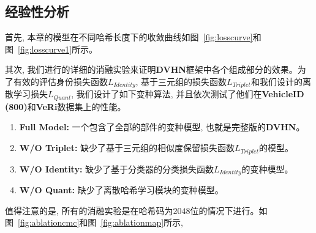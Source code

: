 \subsection{经验性分析}
首先, 本章的模型在不同哈希长度下的收敛曲线如图~\ref{fig:losscurve}和图~\ref{fig:losscurve1}所示。\par
其次, 我们进行的详细的消融实验来证明\textbf{DVHN}框架中各个组成部分的效果。为了有效的评估身份损失函数$L_{Identity}$, 基于三元组的损失函数$L_{Triplet}$和我们设计的离散学习损失$L_{Quant}$, 我们设计了如下变种算法, 并且依次测试了他们在\textbf{VehicleID (800)}和\textbf{VeRi}数据集上的性能。
\begin{enumerate}
    \item \textbf{Full Model:} 一个包含了全部的部件的变种模型, 也就是完整版的\textbf{DVHN}。
    \item \textbf{W/O Triplet:} 缺少了基于三元组的相似度保留损失函数$L_{Triplet}$的模型。 
    \item  \textbf{W/O Identity:} 缺少了基于分类器的分类损失函数$L_{Identity}$的变种模型。
    \item \textbf{W/O Quant:} 缺少了离散哈希学习模块的变种模型。
\end{enumerate}
值得注意的是, 所有的消融实验是在哈希码为$2048$位的情况下进行。如图~\ref{fig:ablationcmc}和图~\ref{fig:ablationmap}所示, 


